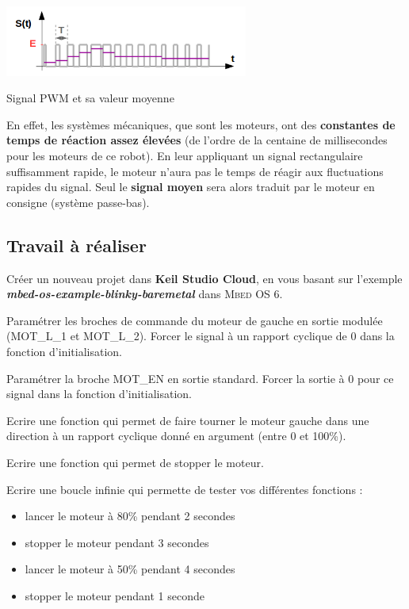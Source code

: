 \documentclass[a4paper,11pt,titlepage]{article} %
\begin{document}
\begin{center}
	\includegraphics[width=0.6\textwidth]{images/MINE_ElecNum_PWM_Signal.png}
	
	Signal PWM et sa valeur moyenne
\end{center}


En effet, les systèmes mécaniques, que sont les moteurs, ont des \textbf{constantes de temps de réaction assez élevées} (de l'ordre de la centaine de millisecondes pour les moteurs de ce robot). En leur appliquant un signal rectangulaire suffisamment rapide, le moteur n'aura pas le temps de réagir aux fluctuations rapides du signal. Seul le \textbf{signal moyen} sera alors traduit par le moteur en consigne (système passe-bas).


\newpage
\subsection{Travail à réaliser}

\Manip Créer un nouveau projet dans \textbf{Keil Studio Cloud}, en vous basant sur l'exemple \textbf{\textsl{mbed-os-example-blinky-baremetal}} dans \textsc{Mbed OS 6}. 

\Manip Paramétrer les broches de commande du moteur de gauche en sortie modulée (\textsc{MOT\_L\_1} et \textsc{MOT\_L\_2}). Forcer le signal à un rapport cyclique de 0 dans la fonction d'initialisation.

\Manip Paramétrer la broche \textsc{MOT\_EN} en sortie standard. Forcer la sortie à 0 pour ce signal dans la fonction d'initialisation.

\Manip Ecrire une fonction qui permet de faire tourner le moteur gauche dans une direction à un rapport cyclique donné en argument (entre 0 et 100\%).

\Manip Ecrire une fonction qui permet de stopper le moteur.

\Manip Ecrire une boucle infinie qui permette de tester vos différentes fonctions :

\begin{itemize}
	\item lancer le moteur à 80\% pendant 2 secondes
	\item stopper le moteur pendant 3 secondes
	\item lancer le moteur à 50\% pendant 4 secondes
	\item stopper le moteur pendant 1 seconde
\end{itemize}
\end{document}
